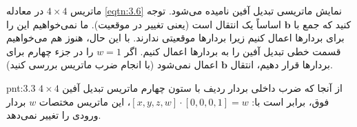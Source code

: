 {\begin{spacing}{1.5}
        ماتریس $4\times 4$ در معادله \ref{eqtn:3.6} نمایش ماتریسی تبدیل آفین نامیده می‌شود.
        توجه کنید که جمع با $\textbf{b}$ اساساً یک انتقال است (یعنی تغییر در موقعیت).
        ما نمی‌خواهیم این را برای بردارها اعمال کنیم زیرا بردارها موقعیتی ندارند.
        با این حال، هنوز هم می‌خواهیم قسمت خطی تبدیل آفین را به بردارها اعمال کنیم.
        اگر $w=1$ را در جزء چهارم برای بردارها قرار دهیم، انتقال $\textbf{b}$ اعمال نمی‌شود (با انجام ضرب ماتریس بررسی کنید).

        \begin{point}{pnt:3.3}
            \Large
            از آنجا که ضرب داخلی بردار ردیف با ستون چهارم ماتریس تبدیل آفین $4\times 4$ فوق، برابر است با:
            $[x, y, z, w]\cdot[0,0,0,1]=w$، این ماتریس مختصات $w$ بردار ورودی را تغییر نمی‌دهد.
        \end{point}
    \end{spacing}
}

